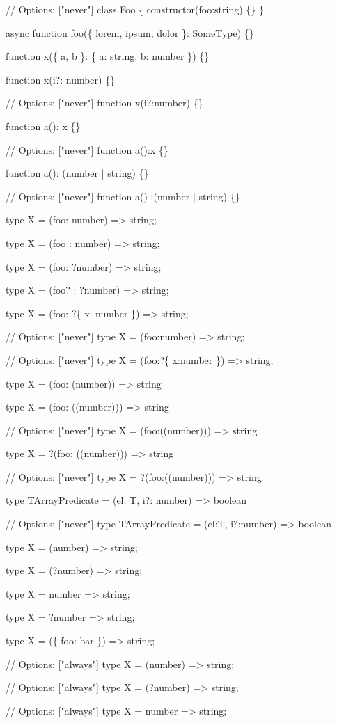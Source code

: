 \begin{DoxyCode}
// Options: ["never"]
class Foo \{ constructor(foo:string) \{\} \}

async function foo(\{ lorem, ipsum, dolor \}: SomeType) \{\}

function x(\{ a, b \}: \{ a: string, b: number \}) \{\}

function x(i?: number) \{\}

// Options: ["never"]
function x(i?:number) \{\}

function a(): x \{\}

// Options: ["never"]
function a():x \{\}

function a(): (number | string) \{\}

// Options: ["never"]
function a() :(number | string) \{\}

type X = (foo: number) => string;

type X = (foo : number) => string;

type X = (foo: ?number) => string;

type X = (foo? : ?number) => string;

type X = (foo: ?\{ x: number \}) => string;

// Options: ["never"]
type X = (foo:number) => string;

// Options: ["never"]
type X = (foo:?\{ x:number \}) => string;

type X = (foo: (number)) => string

type X = (foo: ((number))) => string

// Options: ["never"]
type X = (foo:((number))) => string

type X = ?(foo: ((number))) => string

// Options: ["never"]
type X = ?(foo:((number))) => string

type TArrayPredicate = (el: T, i?: number) => boolean

// Options: ["never"]
type TArrayPredicate = (el:T, i?:number) => boolean

type X = (number) => string;

type X = (?number) => string;

type X = number => string;

type X = ?number => string;

type X = (\{ foo: bar \}) => string;

// Options: ["always"]
type X = (number) => string;

// Options: ["always"]
type X = (?number) => string;

// Options: ["always"]
type X = number => string;


\end{DoxyCode}
